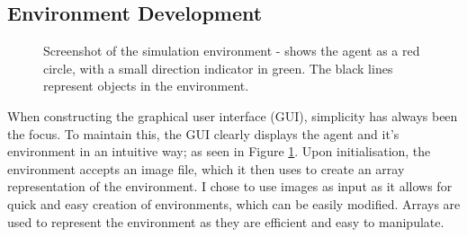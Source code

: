 \documentclass[12pt]{article}
\begin{document}
\subsection{Environment Development}
\begin{figure}[H]
    \centering
    \caption{Screenshot of the simulation environment - shows the agent as a red circle, with a small direction indicator in green. The black lines represent objects in the environment.}
    \label{fig:environment_example}
\end{figure}
When constructing the graphical user interface (GUI), simplicity has always been the focus. To maintain this, the GUI clearly displays
the agent and it's environment in an intuitive way; as seen in Figure \ref{fig:environment_example}. Upon
initialisation, the environment accepts an image file, which it then uses to create an array representation of the environment. I chose
to use images as input as it allows for quick and easy creation of environments, which can be easily modified. Arrays are used to
represent the environment as they are efficient and easy to manipulate.\\
\end{document}
